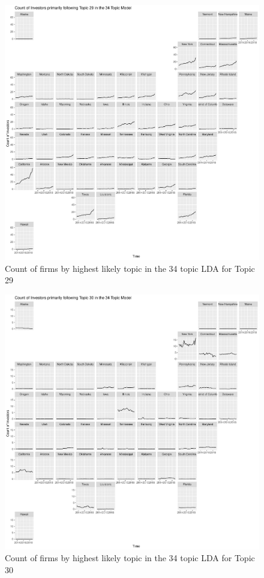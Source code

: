 \begin{figure}
	\centering
	\includegraphics[width=1\linewidth]{Figures/ChapterV/USA_34_Topic29.pdf}
	\caption[Count of Firms for Topic 29 by Quarter]{Count of firms by highest likely topic in the 34 topic LDA for Topic 29}
	\label{fig:StateLDA29}
\end{figure}

\begin{figure}
	\centering
	\includegraphics[width=1\linewidth]{Figures/ChapterV/USA_34_Topic30.pdf}
	\caption[Count of Firms for Topic 30 by Quarter]{Count of firms by highest likely topic in the 34 topic LDA for Topic 30}
	\label{fig:StateLDA30}
\end{figure}

